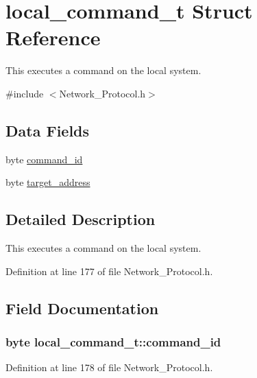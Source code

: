 \hypertarget{structlocal__command__t}{\section{local\-\_\-command\-\_\-t Struct Reference}
\label{structlocal__command__t}
}


This executes a command on the local system.  




{\ttfamily \#include $<$Network\-\_\-\-Protocol.\-h$>$}

\subsection*{Data Fields}
\begin{DoxyCompactItemize}
\item 
byte \hyperlink{structlocal__command__t_adb9208b81faf3a1f5e843185f44a37d5}{command\-\_\-id}
\item 
byte \hyperlink{structlocal__command__t_ab656f0ed36cf31ffb9197747d0f8a640}{target\-\_\-address}
\end{DoxyCompactItemize}


\subsection{Detailed Description}
This executes a command on the local system. 

Definition at line 177 of file Network\-\_\-\-Protocol.\-h.



\subsection{Field Documentation}
\hypertarget{structlocal__command__t_adb9208b81faf3a1f5e843185f44a37d5}{
\subsubsection[{command\-\_\-id}]{\setlength{\rightskip}{0pt plus 5cm}byte local\-\_\-command\-\_\-t\-::command\-\_\-id}}\label{structlocal__command__t_adb9208b81faf3a1f5e843185f44a37d5}


Definition at line 178 of file Network\-\_\-\-Protocol.\-h.

